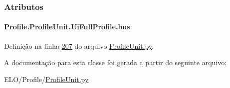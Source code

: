 \subsubsection{Atributos}
\hypertarget{classProfile_1_1ProfileUnit_1_1UiFullProfile_a47049f3f61c7fada93dd84fccd19a2bd}{}
\paragraph[{bus}]{\setlength{\rightskip}{0pt plus 5cm}Profile.\+Profile\+Unit.\+Ui\+Full\+Profile.\+bus}\label{classProfile_1_1ProfileUnit_1_1UiFullProfile_a47049f3f61c7fada93dd84fccd19a2bd}


Definição na linha \hyperlink{ProfileUnit_8py_source_l00207}{207} do arquivo \hyperlink{ProfileUnit_8py_source}{Profile\+Unit.\+py}.



A documentação para esta classe foi gerada a partir do seguinte arquivo\+:\begin{DoxyCompactItemize}
\item 
E\+L\+O/\+Profile/\hyperlink{ProfileUnit_8py}{Profile\+Unit.\+py}\end{DoxyCompactItemize}
